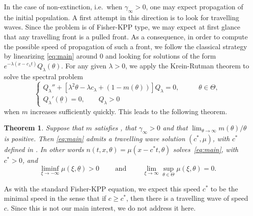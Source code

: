 \documentclass[11pt]{article}    %
\newtheorem{theorem}{Theorem}
\begin{document}
In the case of non-extinction, i.e.~when $\gamma_\infty > 0$, one may expect propagation of the initial population.  A first attempt in this direction is to look for travelling waves. Since the problem is of Fisher-KPP type, we may expect at first glance that any travelling front is a pulled front. As a consequence, in order to compute the possible speed of propagation of such a front, we follow the classical strategy by linearizing \eqref{eq:main} around $0$ and looking for solutions of the form $e^{-\lambda(x-c_\lambda t)} Q_\lambda(\theta)$.  For any given $\lambda > 0$,  we apply the Krein-Rutman theorem to solve the spectral problem
\begin{equation}\label{eq:specQlambda}
\begin{cases}
		Q_\lambda'' + \left[  \lambda^2 \theta - \lambda c_\lambda + (1 -  m(\theta)) \right] Q_\lambda  = 0, &\qquad \theta \in \Theta, \\
Q_\lambda' \left( \underline \theta \right) = 0, \qquad Q_\lambda > 0&
\end{cases}
\end{equation}
when $m$ increases sufficiently quickly. 
%
%
%
This leads to the following theorem. 
\begin{theorem}\label{prop:tw}
Suppose that $m$ satisfies , that $\gamma_\infty > 0$ and that $\lim_{\theta \to \infty} m(\theta)/\theta$ is positive. Then \eqref{eq:main} admits a travelling wave solution $(c^*,\mu)$, with $c^*$ defined in .  In other words $n(t,x,\theta) = \mu(x-c^*t,\theta)$ solves~\eqref{eq:main}, with $c^* >0$, and
	\begin{equation}\label{eq:limits_of_wave}
		\liminf_{\xi\to-\infty} \mu(\xi,\underline\theta)
			> 0
			\qquad\text{ and }\qquad
			\lim_{\xi\to\infty} \sup_{\theta\in\Theta} \mu(\xi,\theta) = 0.
	\end{equation}
\end{theorem}

As with the standard Fisher-KPP equation, we expect this speed $c^*$ to be the minimal speed in the sense that if $c \geq c^*$, then there is a travelling wave of speed $c$.  Since this is not our main interest, we do not address it here.
\end{document}
